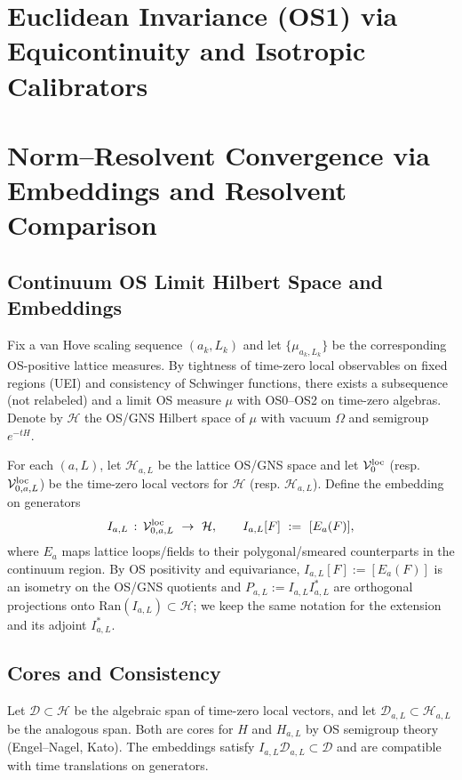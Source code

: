 \documentclass[11pt]{amsart}
\theoremstyle{plain}
\theoremstyle{definition}
\theoremstyle{remark}
\begin{document}
\appendix
\section{Euclidean Invariance (OS1) via Equicontinuity and Isotropic Calibrators}

\medskip
\section{Norm--Resolvent Convergence via Embeddings and Resolvent Comparison}

\subsection*{Continuum OS Limit Hilbert Space and Embeddings}
Fix a van Hove scaling sequence $(a_k,L_k)$ and let $\{\mu_{a_k,L_k}\}$ be the corresponding OS-positive lattice measures. By tightness of time-zero local observables on fixed regions (UEI) and consistency of Schwinger functions, there exists a subsequence (not relabeled) and a limit OS measure $\mu$ with OS0--OS2 on time-zero algebras. Denote by $\mathcal H$ the OS/GNS Hilbert space of $\mu$ with vacuum $\Omega$ and semigroup $e^{-tH}$.

For each $(a,L)$, let $\mathcal H_{a,L}$ be the lattice OS/GNS space and let $\mathcal V^{\rm loc}_0$ (resp. $\mathcal V^{\rm loc}_{0,a,L}$) be the time-zero local vectors for $\mathcal H$ (resp. $\mathcal H_{a,L}$). Define the embedding on generators
\[
  I_{a,L}\,:\, \mathcal V^{\rm loc}_{0,a,L}\ \to\ \mathcal H,
  \qquad I_{a,L}[F]\ :=\ [E_a(F)],
\]
where $E_a$ maps lattice loops/fields to their polygonal/smeared counterparts in the continuum region. By OS positivity and equivariance, $I_{a,L}[F]:=[E_a(F)]$ is an isometry on the OS/GNS quotients and $P_{a,L}:=I_{a,L}I_{a,L}^*$ are orthogonal projections onto $\mathrm{Ran}(I_{a,L})\subset\mathcal H$; we keep the same notation for the extension and its adjoint $I_{a,L}^*$.

\subsection*{Cores and Consistency}
Let $\mathcal D\subset\mathcal H$ be the algebraic span of time-zero local vectors, and let $\mathcal D_{a,L}\subset \mathcal H_{a,L}$ be the analogous span. Both are cores for $H$ and $H_{a,L}$ by OS semigroup theory (Engel--Nagel, Kato). The embeddings satisfy $I_{a,L}\mathcal D_{a,L}\subset\mathcal D$ and are compatible with time translations on generators.
\end{document}
